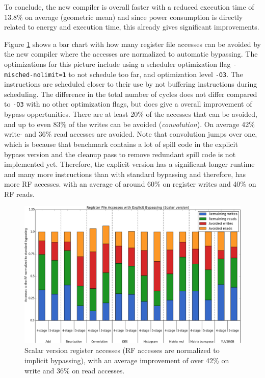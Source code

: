 To conclude, the new compiler is overall faster with a reduced execution time of 13.8\% on average (geometric mean) and since power consumption is directly related to energy and execution time, this already gives significant improvements. 


Figure \ref{fig:scalar_improvements} shows a bar chart with how many register file accesses can be avoided by the new compiler where the accesses are normalized to automatic bypassing. The optimizations for this picture include using a scheduler optimization flag \texttt{-misched-nolimit=1} to not schedule too far, and optimization level \texttt{-O3}. The instructions are scheduled closer to their use by not buffering instructions during scheduling. The difference in the total number of cycles does not differ compared to \texttt{-O3} with no other optimization flags, but does give a overall improvement of bypass oppertunities. There are at least 20\% of the accesses that can be avoided, and up to even 83\% of the writes can be avoided (\emph{convolution}). On average 42\% write- and 36\% read accesses are avoided. Note that convolution jumps over one, which is because that benchmark contains a lot of spill code in the explicit bypass version and the cleanup pass to remove redundant spill code is not implemented yet. Therefore, the explicit version has a significant longer runtime and many more instructions than with standard bypassing and therefore, has more RF accesses. 
with an average of around 60\% on register writes and 40\% on RF reads.\\


\begin{figure}[t!]
\centering
\hspace*{-.12in}
\includegraphics[width=.875\textwidth]{figures/stats/scalar_accesses}
\caption{Scalar version register accesses (RF accesses are normalized to implicit bypassing), with an average improvement of over 42\% on write and 36\% on read accesses.}
\label{fig:scalar_improvements}
\end{figure}

